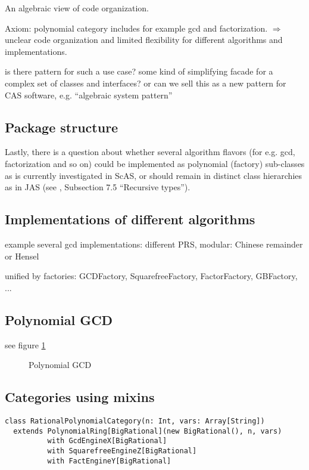 \documentclass{llncs}
\begin{document}
An algebraic view of code organization.

Axiom: polynomial category includes for example gcd and factorization.
$\Longrightarrow$ unclear code organization and limited flexibility for
different algorithms and implementations.

is there pattern \cite{Gamma:1995} for such a use case? some kind of
simplifying facade for a complex set of classes and interfaces? or can
we sell this as a new pattern for CAS software, e.g. ``algebraic system pattern'' 



\subsection{Package structure} %

Lastly, there is a question about whether several algorithm flavors
(for e.g. gcd, factorization and so on) could be implemented as
polynomial (factory) sub-classes as is currently investigated in ScAS,
or should remain in distinct class hierarchies as in JAS (see
\cite{Kredel:2008}, Subsection 7.5 ``Recursive types'').


\subsection{Implementations of different algorithms} %

example several gcd implementations: different PRS, modular: Chinese
remainder or Hensel

unified by factories:
GCDFactory, SquarefreeFactory, FactorFactory, GBFactory, ...

\subsection{Polynomial GCD} %

see figure \ref{fig:poly}

\begin{figure}[thb]
\centering
{}
\caption{Polynomial GCD}
\label{fig:poly}
\end{figure}

\subsection{Categories using mixins} %


\begin{verbatim}
class RationalPolynomialCategory(n: Int, vars: Array[String])
  extends PolynomialRing[BigRational](new BigRational(), n, vars)
          with GcdEngineX[BigRational] 
          with SquarefreeEngineZ[BigRational]
          with FactEngineY[BigRational]
\end{verbatim}
\end{document}
